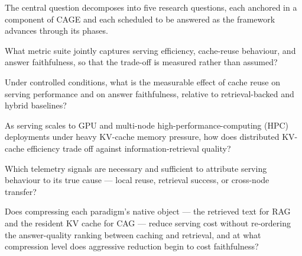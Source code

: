 %
%



The central question decomposes into five research questions, each anchored in a
component of CAGE and each scheduled to be answered as the framework advances
through its phases.

\begin{compactitem}
  \item[\textbf{RQ1}] What metric suite jointly captures serving efficiency, cache-reuse behaviour, and answer faithfulness, so that the trade-off is measured rather than assumed?
  \item[\textbf{RQ2}] Under controlled conditions, what is the measurable effect of cache reuse on serving performance and on answer faithfulness, relative to retrieval-backed and hybrid baselines?
  \item[\textbf{RQ3}] As serving scales to GPU and multi-node high-performance-computing (HPC) deployments under heavy KV-cache memory pressure, how does distributed KV-cache efficiency trade off against information-retrieval quality?
  \item[\textbf{RQ4}] Which telemetry signals are necessary and sufficient to attribute serving behaviour to its true cause --- local reuse, retrieval success, or cross-node transfer?
  \item[\textbf{RQ5}] Does compressing each paradigm's native object --- the retrieved text for RAG and the resident KV cache for CAG --- reduce serving cost without re-ordering the answer-quality ranking between caching and retrieval, and at what compression level does aggressive reduction begin to cost faithfulness?
\end{compactitem}

